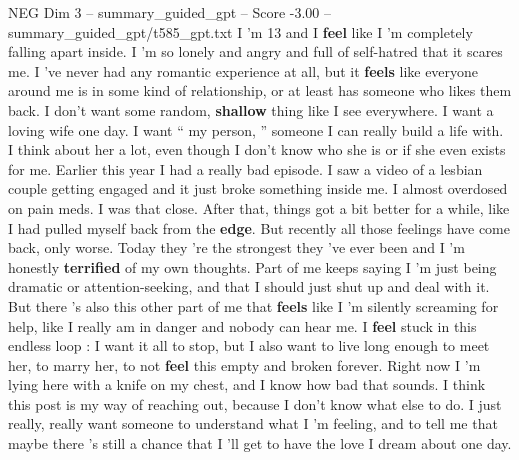 \begin{textsample}{NEG Dim 3 – summary\_guided\_gpt – Score -3.00 – summary\_guided\_gpt/t585\_gpt.txt}  \label{ex:f3_neg_028}
I ’m 13 and I \textbf{feel} like I ’m completely falling apart inside.
I ’m so lonely and angry and full of self-hatred that it scares me.
I ’ve never had any romantic experience at all, but it \textbf{feels} like everyone around me is in some kind of relationship, or at least has someone who likes them back.
I don't want some random, \textbf{shallow} thing like I see everywhere.
I want a loving wife one day.
I want “ my person, ” someone I can really build a life with.
I think about her a lot, even though I don't know who she is or if she even exists for me.
Earlier this year I had a really bad episode.
I saw a video of a lesbian couple getting engaged and it just broke something inside me.
I almost overdosed on pain meds.
I was that close.
After that, things got a bit better for a while, like I had pulled myself back from the \textbf{edge}.
But recently all those feelings have come back, only worse.
Today they ’re the strongest they ’ve ever been and I ’m honestly \textbf{terrified} of my own thoughts.
Part of me keeps saying I ’m just being dramatic or attention-seeking, and that I should just shut up and deal with it.
But there ’s also this other part of me that \textbf{feels} like I ’m silently screaming for help, like I really am in danger and nobody can hear me.
I \textbf{feel} stuck in this endless loop : I want it all to stop, but I also want to live long enough to meet her, to marry her, to not \textbf{feel} this empty and broken forever.
Right now I ’m lying here with a knife on my chest, and I know how bad that sounds.
I think this post is my way of reaching out, because I don't know what else to do.
I just really, really want someone to understand what I ’m feeling, and to tell me that maybe there ’s still a chance that I ’ll get to have the love I dream about one day.

\end{textsample}
